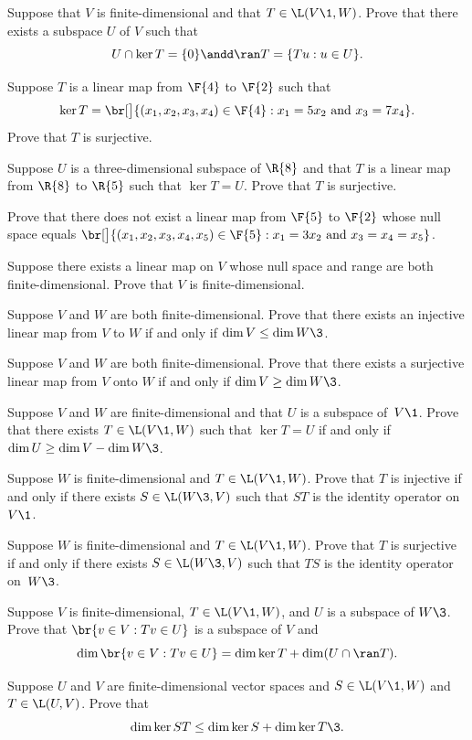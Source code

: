 \exercise
Suppose that $V$ is finite-dimensional and that $T \in \L(V\1,W)$.  Prove that
there exists a subspace $U$ of $V$ such that
\[
U \cap \ker T = \{0\} \andd \ran T = \{Tu:u\in U\}.
\]
\exercisedisplayend


\exercise
Suppose $T$ is a linear map from $\F{4}$ to $\F{2}$ such that
\[
\ker T = \br[\big]{(x_1, x_2, x_3, x_4) \in \F{4}: x_1 = 5 x_2 \mbox{\ and\ } x_3 = 7 x_4 }.
\]
Prove that $T$ is surjective.


\exercise
Suppose $U$ is a three-dimensional subspace of $\R{8}$ and that $T$ is a linear
map from $\R{8}$ to $\R{5}$ such that $\ker  T  = U$.  Prove that $T$
is  surjective.


\exercise
Prove that there does not exist a linear map from $\F{5}$ to $\F{2}$ whose
null space equals
$
\br[\big]{(x_1, x_2, x_3, x_4, x_5) \in \F{5}: x_1 = 3 x_2 \mbox{\ and\ } x_3 = x_4 = x_5}$.


\exercise
Suppose there exists a linear map on $V$ whose null space and range are both
finite-dimensional. Prove that $V$ is finite-dimensional.


\exercise
Suppose $V$ and $W$ are both finite-dimensional.  Prove that there exists
an injective linear map from $V$ to $W$ if and only if \mbox{$\dim V \le \dim W\3$.}


\exercise
Suppose $V$ and $W$ are both finite-dimensional.  Prove that there exists
a surjective linear map from $V$ onto $W$ if and only if \mbox{$\dim V \ge \dim W\3$.}


\exercise
Suppose $V$ and $W$ are finite-dimensional and that
$U$ is a subspace of~$V\1$.
Prove that there exists $T \in \L(V\1,W)$ such that $\ker T = U$
if and only if $\dim U \ge \dim V - \dim W\3$.


\exercise
Suppose $W$ is finite-dimensional and $T \in \L(V\1,W)$.  Prove that $T$ is
injective if and only if there exists $S \in \L(W\3, V)$ such that $ST$ is the identity operator on~$V\1$.


\exercise
Suppose $W$ is finite-dimensional and $T \in \L(V\1,W)$.  Prove that $T$  is
surjective if and only if there exists $S \in \L(W\3, V)$ such that $TS$ is the
identity operator  on~$W\3$.


\exercise
Suppose $V$  is finite-dimensional, $T \in \L(V\1, W)$, and $U$ is a subspace of $W\3$. Prove that $\br{v \in V: Tv \in U}$ is a subspace of $V$ and\label{3diminv}
\[
\dim \br{v \in V: Tv \in U} = \dim \ker T + \dim (U \cap \ran T).
\]
\exercisedisplayend


\exercise
Suppose $U$ and $V$ are finite-dimensional vector spaces and
\mbox{$S \in \L(V\1, W)$} and $T \in \L(U, V)$.  Prove that
\[
\dim \ker ST \le \dim \ker S + \dim \ker T\3.
\]
\exercisedisplayend


